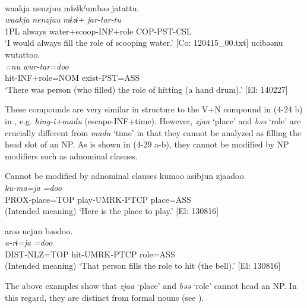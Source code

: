 \ex{}\\
\glll     waakja  {\textbar}nenzjuu{\textbar}  mɨzɨkˀumbəə  jatattu.\\
      \textit{waakja}  \textit{nenzjuu}  \textit{mɨzɨ+}  \textit{jar-tar-tu}\\
      1PL  always  water+scoop-INF+role  COP-PST-CSL\\
      \glt       ‘I would always fill the role of scooping water.’ [Co: 120415\_00.txt]
\ex %
\glll   ucibəənu  wutattoo.\\
      \textit{=nu}  \textit{wur-tar=doo}\\
      hit-INF+role=NOM  exist-PST=ASS\\
      \glt       ‘There was person (who filled) the role of hitting (a hand drum).’ [El: 140227]
    \z
\z

These compounds are very similar in structure to the V+N compound in (4-24 b) in , e.g. \textit{hing-i+madu} (escape-INF+time). However, \textit{zjaa} ‘place’ and \textit{bəə} ‘role’ are crucially different from \textit{madu} ‘time’ in that they cannot be analyzed as filling the head slot of an NP. As is shown in (4-29 a-b), they cannot be modified by NP modifiers such as adnominal clasues.

\ea  Cannot be modified by adnominal clauses \label{ex:4.29}
\ea\label{ex:4.29a}
\glll   *kumoo  asɨbjun  zjaadoo.\\
       \textit{ku-ma=ja}  \textit{}  \textit{=doo}\\
      PROX-place=TOP  play-UMRK-PTCP  place=ASS\\
      \glt       (Intended meaning) ‘Here is the place to play.’ [El: 130816]

\ex\label{ex:4.29b} %
\glll  *arəə  ucjun  bəədoo.\\
       \textit{a-rɨ=ja}  \textit{}  \textit{=doo}\\
       DIST-NLZ=TOP  hit-UMRK-PTCP  role=ASS\\
      \glt       (Intended meaning) ‘That person fills the role to hit (the bell).’ [El: 130816]
    \z
\z

The above examples show that \textit{zjaa} ‘place’ and \textit{bəə} ‘role’ cannot head an NP. In this regard, they are distinct from formal nouns (see ).

